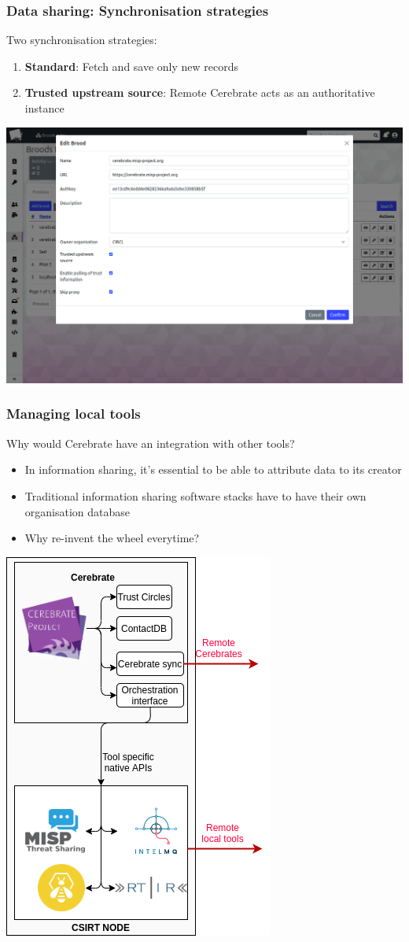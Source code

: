 \begin{frame}
\frametitle{Data sharing: Synchronisation strategies}
Two synchronisation strategies:
    \begin{enumerate}
        \item \textbf{Standard}: Fetch and save only new records
        \item \textbf{Trusted upstream source}: Remote Cerebrate acts as an authoritative instance
    \end{enumerate}
    \begin{center}
        \includegraphics[width=0.7\linewidth]{pictures/brood-edit.png}
    \end{center}
\end{frame}

\begin{frame}
\frametitle{Managing local tools}
Why would Cerebrate have an integration with other tools?
    \begin{itemize}
        \item In information sharing, it's essential to be able to attribute data to its creator
        \item Traditional information sharing software stacks have to have their own organisation database
        \item Why re-invent the wheel everytime?
    \end{itemize}
    \begin{center}
        \includegraphics[width=0.2\linewidth]{pictures/software-stack.png}
    \end{center}
\end{frame}


